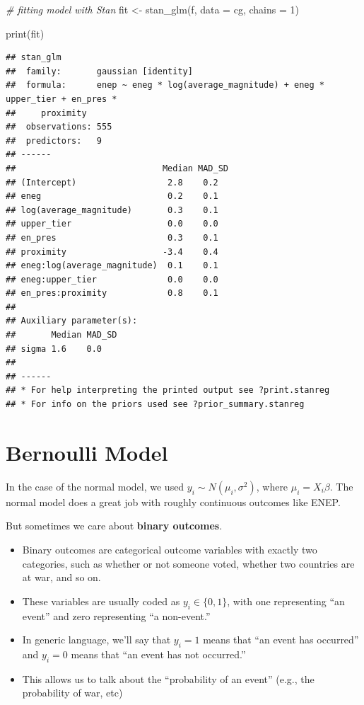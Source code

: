 \documentclass[
]{book}
\newenvironment{Shaded}{\begin{snugshade}}{\end{snugshade}}
\newcommand{\AttributeTok}[1]{\textcolor[rgb]{0.77,0.63,0.00}{#1}}
\newcommand{\CommentTok}[1]{\textcolor[rgb]{0.56,0.35,0.01}{\textit{#1}}}
\newcommand{\DecValTok}[1]{\textcolor[rgb]{0.00,0.00,0.81}{#1}}
\newcommand{\FunctionTok}[1]{\textcolor[rgb]{0.00,0.00,0.00}{#1}}
\newcommand{\NormalTok}[1]{#1}
\newcommand{\OtherTok}[1]{\textcolor[rgb]{0.56,0.35,0.01}{#1}}
\providecommand{\tightlist}{%
  \setlength{\itemsep}{0pt}\setlength{\parskip}{0pt}}
\begin{document}
\begin{Shaded}
\begin{Highlighting}[]
\CommentTok{\# fitting model with Stan}
\NormalTok{fit }\OtherTok{\textless{}{-}} \FunctionTok{stan\_glm}\NormalTok{(f, }\AttributeTok{data =}\NormalTok{ cg, }\AttributeTok{chains =} \DecValTok{1}\NormalTok{)}
\end{Highlighting}
\end{Shaded}

\begin{Shaded}
\begin{Highlighting}[]
\FunctionTok{print}\NormalTok{(fit)}
\end{Highlighting}
\end{Shaded}

\begin{verbatim}
## stan_glm
##  family:       gaussian [identity]
##  formula:      enep ~ eneg * log(average_magnitude) + eneg * upper_tier + en_pres * 
##     proximity
##  observations: 555
##  predictors:   9
## ------
##                             Median MAD_SD
## (Intercept)                  2.8    0.2  
## eneg                         0.2    0.1  
## log(average_magnitude)       0.3    0.1  
## upper_tier                   0.0    0.0  
## en_pres                      0.3    0.1  
## proximity                   -3.4    0.4  
## eneg:log(average_magnitude)  0.1    0.1  
## eneg:upper_tier              0.0    0.0  
## en_pres:proximity            0.8    0.1  
## 
## Auxiliary parameter(s):
##       Median MAD_SD
## sigma 1.6    0.0   
## 
## ------
## * For help interpreting the printed output see ?print.stanreg
## * For info on the priors used see ?prior_summary.stanreg
\end{verbatim}

\hypertarget{bernoulli-model}{%
\section{Bernoulli Model}\label{bernoulli-model}}

In the case of the normal model, we used
\(y_i \sim N(\mu_i, \sigma^2)\), where \(\mu_i = X_i\beta\). The normal
model does a great job with roughly continuous outcomes like ENEP.

But sometimes we care about \textbf{binary outcomes}.

\begin{itemize}
\tightlist
\item
  Binary outcomes are categorical outcome variables with exactly two
  categories, such as whether or not someone voted, whether two
  countries are at war, and so on.
\item
  These variables are usually coded as \(y_i \in \{0, 1\}\), with one
  representing ``an event'' and zero representing ``a non-event.''
\item
  In generic language, we'll say that \(y_i = 1\) means that ``an event
  has occurred'' and \(y_i = 0\) means that ``an event has not
  occurred.''
\item
  This allows us to talk about the ``probability of an event'' (e.g.,
  the probability of war, etc)
\end{itemize}
\end{document}
